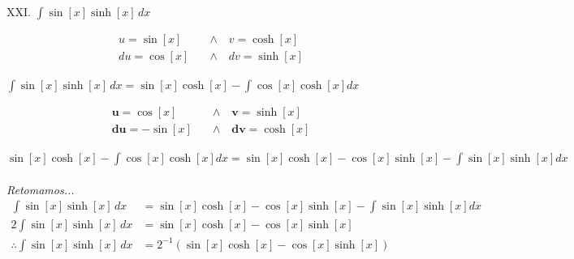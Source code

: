 \documentclass{article}
\newcommand{\ints}{\displaystyle \int \!}
\begin{document}
\noindent XXI.  $\ints \sin[x] \sinh[x] \, dx$
\begin{center}
\begin{tcolorbox}[title=Considérense las siguientes variables para la integración por partes., width=0.7\linewidth, top=0pt]
    \begin{align*}
        u = \sin[x] \quad &\land \quad v = \cosh[x] \\
        du = \cos[x] \quad &\land \quad dv = \sinh[x]
    \end{align*}
\end{tcolorbox}
\end{center}
\(
\ints \sin[x] \sinh[x] \, dx = \sin[x] \cosh[x] - \ints \cos[x] \cosh[x] dx
\)
\begin{center}
\begin{tcolorbox}[title=Considérense estas nuevas variables para la integración por partes., width=0.7\linewidth, top=0pt]
    \begin{align*}
        \textbf{u} = \cos[x] \quad &\land \quad \textbf{v} = \sinh[x] \\
        \textbf{du} = -\sin[x] \quad &\land \quad \textbf{dv} = \cosh[x]
    \end{align*}
\end{tcolorbox}
\end{center}
\(
\sin[x] \cosh[x] - \ints \cos[x] \cosh[x]dx = \sin[x]\cosh[x] - \cos[x] \sinh[x] - \ints \sin[x] \sinh[x] dx
\) \\\\
\textit{Retomamos...} \\
\begin{align*}
    \ints \sin[x] \sinh[x] \, dx &= \sin[x]\cosh[x] - \cos[x]\sinh[x] - \ints \sin[x]\sinh[x] dx \\
    2\ints \sin[x] \sinh[x] \, dx &= \sin[x]\cosh[x] - \cos[x]\sinh[x] \\
    \therefore \ints \sin[x] \sinh[x] \, dx &= 2^{-1}(\sin[x]\cosh[x] - \cos[x]\sinh[x])
\end{align*}
\\\\\\\\
\end{document}
